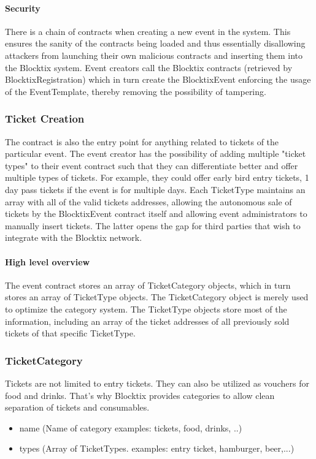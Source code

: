 \documentclass[a4paper]{article}
\begin{document}
\paragraph{Security} There is a chain of contracts when creating a new event in the system. This ensures the sanity of the contracts being loaded and thus essentially disallowing attackers from launching their own malicious contracts and inserting them into the Blocktix system. Event creators call the Blocktix contracts (retrieved by BlocktixRegistration) which in turn create the BlocktixEvent enforcing the usage of the EventTemplate, thereby removing the possibility of tampering.

\subsubsection{Ticket Creation}
The contract is also the entry point for anything related to tickets of the particular event. The event creator has the possibility of adding multiple "ticket types" to their event contract such that they can differentiate better and offer multiple types of tickets. For example, they could offer early bird entry tickets, 1 day pass tickets if the event is for multiple days. Each TicketType maintains an array with all of the valid tickets addresses, allowing the autonomous sale of tickets by the BlocktixEvent contract itself and allowing event administrators to manually insert tickets. The latter opens the gap for third parties that wish to integrate with the Blocktix network. 

\paragraph{High level overview}
The event contract stores an array of TicketCategory objects, which in turn stores an array of TicketType objects. The TicketCategory object is merely used to optimize the category system. The TicketType objects store most of the information, including an array of the ticket addresses of all previously sold tickets of that specific TicketType. 

\subsubsection{TicketCategory} Tickets are not limited to entry tickets. They can also be utilized as vouchers for food and drinks. That's why Blocktix provides categories to allow clean separation of tickets and consumables. 
\begin{itemize}
\item name (Name of category examples: tickets, food, drinks, ..)
\item types (Array of TicketTypes. examples: entry ticket, hamburger, beer,...)
\end{itemize}
\end{document}
